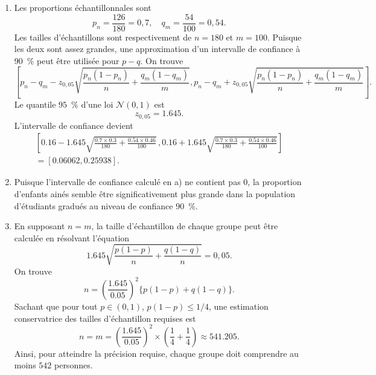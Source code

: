 \begin{solution}{5.11}
\begin{enumerate}
\item Les proportions échantillonnales sont
$$
p_n = \frac{126}{180}=0,7, \quad q_m = \frac{54}{100}=0,54.
$$
Les tailles d'échantillons sont respectivement de $n=180$ et $m=100$. Puisque les deux sont assez grandes, une approximation d'un intervalle de confiance à $90$~\% peut être utilisée pour $p-q$. On trouve
$$
\left[ p_n - q_m - z_{0,05} \sqrt{\frac{p_n(1-p_n)}{n} + \frac{q_m(1-q_m)}{m}},  p_n - q_m + z_{0,05} \sqrt{\frac{p_n(1-p_n)}{n} + \frac{q_m(1-q_m)}{m}}\right].
$$
Le quantile $95$~\% d'une loi $\mathcal{N}(0,1)$ est
$$
z_{0,05} = 1.645.
$$
L'intervalle de confiance devient
\begin{multline*}
\left [0.16 - 1.645\sqrt{\frac{0.7 \times 0.3}{180} + \frac{0.54\times 0.46}{100}} \, , 0.16 + 1.645\sqrt{\frac{0.7 \times 0.3}{180} + \frac{0.54\times 0.46}{100}}\right] \\ = [0.06062,0.25938].
\end{multline*}

\item Puisque l'intervalle de confiance calculé en a) ne contient pas $0$, la proportion d'enfants ainés semble être significativement plus grande dans la population d'étudiants gradués au niveau de confiance $90$~\%.

\item En supposant $n=m$, la taille d'échantillon de chaque groupe peut être calculée en résolvant l'équation
$$
1.645\sqrt{\frac{p(1-p)}{n} + \frac{q(1-q)}{n}} = 0,05.
$$
On trouve
$$
n = \left(\frac{1.645}{0.05}\right)^2 \{ p(1-p)+ q(1-q)\}.
$$
Sachant que pour tout $p\in(0,1)$, $p(1-p) \le 1/4$, une estimation conservatrice des tailles d'échantillon requises est
$$
n = m=  \left(\frac{1.645}{0.05}\right)^2 \times \left(\frac{1}{4} + \frac{1}{4} \right) \approx 541.205.
$$
Ainsi, pour atteindre la précision requise, chaque groupe doit comprendre au moins $542$ personnes.
\end{enumerate}
\end{solution}
